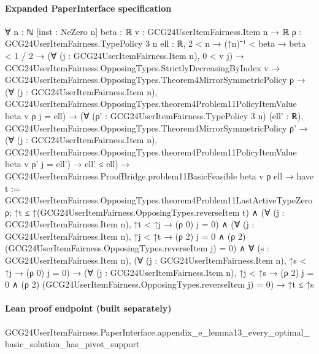 \documentclass[10pt]{article}
\begin{document}
\paragraph{Expanded PaperInterface specification}
\begin{ReviewVerbatim}
∀ {n : ℕ} [inst : NeZero n] {beta : ℝ} {v : GCG24UserItemFairness.Item n → ℝ} {ρ : GCG24UserItemFairness.TypePolicy 3 n}
  {ell : ℝ},
  2 < n →
    (↑n)⁻¹ < beta →
      beta < 1 / 2 →
        (∀ (j : GCG24UserItemFairness.Item n), 0 < v j) →
          GCG24UserItemFairness.OpposingTypes.StrictlyDecreasingByIndex v →
            GCG24UserItemFairness.OpposingTypes.Theorem4MirrorSymmetricPolicy ρ →
              (∀ (j : GCG24UserItemFairness.Item n),
                  GCG24UserItemFairness.OpposingTypes.theorem4Problem11PolicyItemValue beta v ρ j = ell) →
                (∀ (ρ' : GCG24UserItemFairness.TypePolicy 3 n) (ell' : ℝ),
                    GCG24UserItemFairness.OpposingTypes.Theorem4MirrorSymmetricPolicy ρ' →
                      (∀ (j : GCG24UserItemFairness.Item n),
                          GCG24UserItemFairness.OpposingTypes.theorem4Problem11PolicyItemValue beta v ρ' j = ell') →
                        ell' ≤ ell) →
                  GCG24UserItemFairness.ProofBridge.problem11BasicFeasible beta v ρ ell →
                    have t := GCG24UserItemFairness.OpposingTypes.theorem4Problem11LastActiveTypeZero ρ;
                    ↑t ≤ ↑(GCG24UserItemFairness.OpposingTypes.reverseItem t) ∧
                      (∀ (j : GCG24UserItemFairness.Item n), ↑t < ↑j → (ρ 0) j = 0) ∧
                        (∀ (j : GCG24UserItemFairness.Item n),
                            ↑j < ↑t → (ρ 2) j = 0 ∧ (ρ 2) (GCG24UserItemFairness.OpposingTypes.reverseItem j) = 0) ∧
                          ∀ (s : GCG24UserItemFairness.Item n),
                            (∀ (j : GCG24UserItemFairness.Item n), ↑s < ↑j → (ρ 0) j = 0) →
                              (∀ (j : GCG24UserItemFairness.Item n),
                                  ↑j < ↑s →
                                    (ρ 2) j = 0 ∧ (ρ 2) (GCG24UserItemFairness.OpposingTypes.reverseItem j) = 0) →
                                ↑t ≤ ↑s
\end{ReviewVerbatim}

\paragraph{Lean proof endpoint (built separately)}\begin{ReviewVerbatim}
GCG24UserItemFairness.PaperInterface.appendix_e_lemma13_every_optimal_basic_solution_has_pivot_support
\end{ReviewVerbatim}
\end{document}
